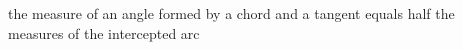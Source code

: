 \documentclass[preview]{standalone}
\begin{document}
\begin{flushleft}
the measure of an angle formed by a chord and a tangent equals half the measures of the intercepted arc
\end{flushleft}
\end{document}
